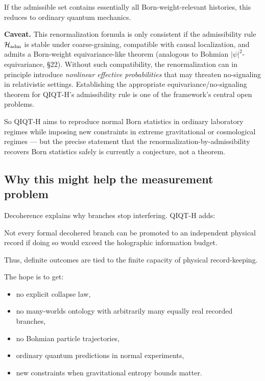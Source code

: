 \documentclass[11pt,a4paper]{article}
\newenvironment{qiqtquote}{\begin{mdframed}[style=quotestyle]}{\end{mdframed}}
\begin{document}
If the admissible set contains essentially all Born-weight-relevant histories, this reduces to ordinary quantum mechanics.

\textbf{Caveat.} This renormalization formula is only consistent if the admissibility rule $\mathcal{H}_{\rm adm}$ is stable under coarse-graining, compatible with causal localization, and admits a Born-weight equivariance-like theorem (analogous to Bohmian $|\psi|^2$-equivariance, §22). Without such compatibility, the renormalization can in principle introduce \emph{nonlinear effective probabilities} that may threaten no-signaling in relativistic settings. Establishing the appropriate equivariance/no-signaling theorem for QIQT-H's admissibility rule is one of the framework's central open problems.

So QIQT-H aims to reproduce normal Born statistics in ordinary laboratory regimes while imposing new constraints in extreme gravitational or cosmological regimes — but the precise statement that the renormalization-by-admissibility recovers Born statistics safely is currently a conjecture, not a theorem.

\subsection{Why this might help the measurement problem}

Decoherence explains why branches stop interfering. QIQT-H adds:

\begin{qiqtquote}
Not every formal decohered branch can be promoted to an independent physical record if doing so would exceed the holographic information budget.
\end{qiqtquote}

Thus, definite outcomes are tied to the finite capacity of physical record-keeping.

The hope is to get:

\begin{itemize}
  \item no explicit collapse law,
  \item no many-worlds ontology with arbitrarily many equally real recorded branches,
  \item no Bohmian particle trajectories,
  \item ordinary quantum predictions in normal experiments,
  \item new constraints when gravitational entropy bounds matter.
\end{itemize}
\end{document}
